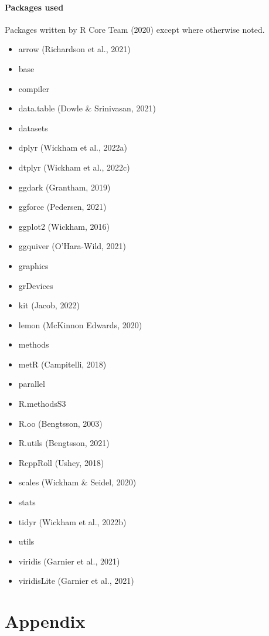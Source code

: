 \subsection{Packages used}
Packages written by R Core Team (2020) except where otherwise noted.
\begin{itemize}
\item arrow (Richardson et al., 2021)
\item base
\item compiler
\item data.table (Dowle \& Srinivasan, 2021)
\item datasets
\item dplyr (Wickham et al., 2022a)
\item dtplyr (Wickham et al., 2022c)
\item ggdark (Grantham, 2019)
\item ggforce (Pedersen, 2021)
\item ggplot2 (Wickham, 2016)
\item ggquiver (O'Hara-Wild, 2021)
\item graphics
\item grDevices
\item kit (Jacob, 2022)
\item lemon (McKinnon Edwards, 2020)
\item methods
\item metR (Campitelli, 2018)
\item parallel
\item R.methodsS3
\item R.oo (Bengtsson, 2003)
\item R.utils (Bengtsson, 2021)
\item RcppRoll (Ushey, 2018)
\item scales (Wickham \& Seidel, 2020)
\item stats
\item tidyr (Wickham et al., 2022b)
\item utils
\item viridis (Garnier et al., 2021)
\item viridisLite (Garnier et al., 2021)
\end{itemize}

\appendix
\part{Appendix}
\renewcommand{\thechapter}{\alph{chapter}}

